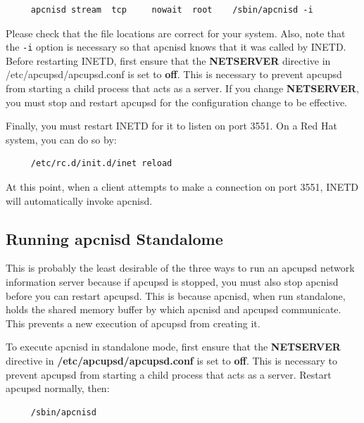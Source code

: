 {{{{{{{{{\footnotesize
\begin{verbatim}
     apcnisd stream  tcp     nowait  root    /sbin/apcnisd -i
\end{verbatim}
\normalsize

Please check that the file locations are correct for your system. Also, note
that the {\tt -i} option is necessary so that apcnisd knows that it was called
by INETD. Before restarting INETD, first ensure that the {\bf NETSERVER}
directive in /etc/apcupsd/apcupsd.conf is set to {\bf off}. This is necessary
to prevent apcupsd from starting a child process that acts as a server. If you
change {\bf NETSERVER}, you must stop and restart apcupsd for the
configuration change to be effective.  

Finally, you must restart INETD for it to listen on port 3551. On a Red Hat
system, you can do so by: 

\footnotesize
\begin{verbatim}
     /etc/rc.d/init.d/inet reload
\end{verbatim}
\normalsize

At this point, when a client attempts to make a connection on port 3551, INETD
will automatically invoke apcnisd. 

\label{Running-apcnisd-Standalome}

\subsection*{Running apcnisd Standalome}

This is probably the least desirable of the three ways to run an apcupsd
network information server because if apcupsd is stopped, you must also stop
apcnisd before you can restart apcupsd. This is because apcnisd, when run
standalone, holds the shared memory buffer by which apcnisd and apcupsd
communicate. This prevents a new execution of apcupsd from creating it.  

To execute apcnisd in standalone mode, first ensure that the {\bf NETSERVER}
directive in {\bf /etc/apcupsd/apcupsd.conf} is set to {\bf off}. This is
necessary to prevent apcupsd from starting a child process that acts as a
server. Restart apcupsd normally, then: 

\footnotesize
\begin{verbatim}
     /sbin/apcnisd
\end{verbatim}
\normalsize

}}}}}}}}}
